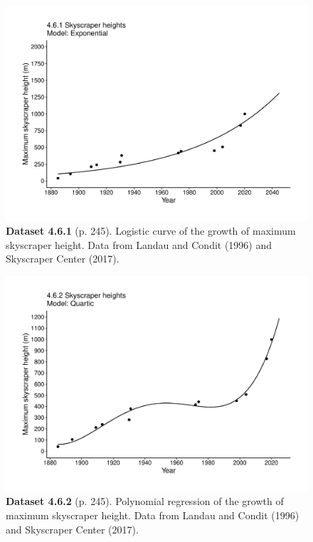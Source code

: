 \documentclass[aps,rmp,preprint,superscriptaddress,10pt,onecolumn]{article}
\begin{document}
\clearpage
\begin{figure}[h]
\includegraphics[width=\textwidth]{output/figs-ggplot/4.6.1.pdf}
\caption*{\textbf{Dataset 4.6.1} (p. 245). Logistic curve of the growth of maximum skyscraper height. Data from Landau and Condit (1996) and Skyscraper Center (2017).}
\end{figure}
	
\clearpage
\begin{figure}[h]
\includegraphics[width=\textwidth]{output/figs-ggplot/4.6.2.pdf}
\caption*{\textbf{Dataset 4.6.2} (p. 245). Polynomial regression of the growth of maximum skyscraper height. Data from Landau and Condit (1996) and Skyscraper Center (2017). }
\end{figure}
	
\end{document}
